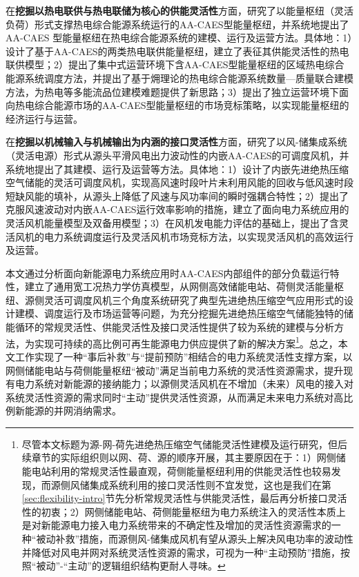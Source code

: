 在\textbf{挖掘以热电联供与热电联储为核心的供能灵活性}方面，研究了以能量枢纽（灵活负荷）形式支撑热电综合能源系统运行的AA-CAES型能量枢纽，并系统地提出了AA-CAES 型能量枢纽在热电综合能源系统的建模、运行及运营方法。具体地：1）设计了基于AA-CAES的两类热电联供能量枢纽，建立了表征其供能灵活性的热电联供模型；2）提出了集中式运营环境下含AA-CAES型能量枢纽的区域热电综合能源系统调度方法，并提出了基于㶲理论的热电综合能源系统数量—质量联合建模方法，为热电等多能流品位建模难题提供了新思路；3）提出了独立运营环境下面向热电综合能源市场的AA-CAES型能量枢纽的市场竞标策略，以实现能量枢纽的经济运行与运营。

在\textbf{挖掘以机械输入与机械输出为内涵的接口灵活性}方面，研究了以风-储集成系统（灵活电源）形式从源头平滑风电出力波动性的内嵌AA-CAES的可调度风机，并系统地提出了其建模、运行及运营等方法。具体地：1）设计了内嵌先进绝热压缩空气储能的灵活可调度风机，实现高风速时段叶片未利用风能的回收与低风速时段短缺风能的填补，从源头上降低了风速与风功率间的瞬时强耦合特性；2）提出了克服风速波动对内嵌AA-CAES运行效率影响的措施，建立了面向电力系统应用的灵活风机能量模型及双备用模型；3）在风机发电能力评估的基础上，提出了含灵活风机的电力系统调度运行及灵活风机市场竞标方法，以实现灵活风机的高效运行及运营。

本文通过分析面向新能源电力系统应用时AA-CAES内部组件的部分负载运行特性，建立了通用宽工况热力学仿真模型，从网侧高效储能电站、荷侧灵活能量枢纽、源侧灵活可调度风机三个角度系统研究了典型先进绝热压缩空气应用形式的设计建模、调度运行及市场运营等问题，为充分挖掘先进绝热压缩空气储能独特的储能循环的常规灵活性、供能灵活性及接口灵活性提供了较为系统的建模与分析方法，为实现可持续的高比例可再生能源电力供应提供了新的解决方案\footnote{尽管本文标题为源-网-荷先进绝热压缩空气储能灵活性建模及运行研究，但后续章节的实际组织则以网、荷、源的顺序开展，其主要原因在于：1）网侧储能电站利用的常规灵活性最直观，荷侧能量枢纽利用的供能灵活性也较易发现，而源侧风储集成系统利用的接口灵活性则不宜发觉，这也是我们在第\ref{sec:flexibility-intro}节先分析常规灵活性与供能灵活性，最后再分析接口灵活性的初衷；2）网侧储能电站、荷侧能量枢纽为电力系统注入的灵活性本质上是对新能源电力接入电力系统带来的不确定性及增加的灵活性资源需求的一种“被动补救”措施，而源侧风-储集成风机有望从源头上解决风电功率的波动性并降低对风电并网对系统灵活性资源的需求，可视为一种“主动预防”措施，按照“被动”-“主动”的逻辑组织结构更耐人寻味。}。总之，本文工作实现了一种“事后补救”与“提前预防”相结合的电力系统灵活性支撑方案，以网侧储能电站与荷侧能量枢纽“被动”满足当前电力系统的灵活性资源需求，提升现有电力系统对新能源的接纳能力；以源侧灵活风机在不增加（未来）风电的接入对系统灵活性资源的需求同时“主动”提供灵活性资源，从而满足未来电力系统对高比例新能源的并网消纳需求。

